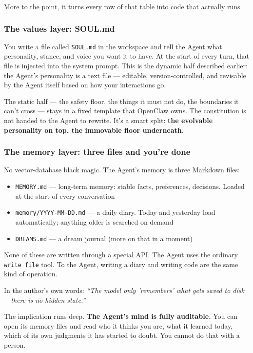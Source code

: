 \documentclass[11pt,a4paper]{article}
\begin{document}
More to the point, it turns every row of that table into code that actually runs.

\subsubsection{The values layer: SOUL.md}

You write a file called \texttt{SOUL.md} in the workspace and tell the Agent what personality, stance, and voice you want it to have. At the start of every turn, that file is injected into the system prompt. This is the dynamic half described earlier: the Agent's personality is a text file --- editable, version-controlled, and revisable by the Agent itself based on how your interactions go.

The static half --- the safety floor, the things it must not do, the boundaries it can't cross --- stays in a fixed template that OpenClaw owns. The constitution is not handed to the Agent to rewrite. It's a smart split: \textbf{the evolvable personality on top, the immovable floor underneath.}

\subsubsection{The memory layer: three files and you're done}

No vector-database black magic. The Agent's memory is three Markdown files:

\begin{itemize}
  \item \texttt{MEMORY.md} --- long-term memory: stable facts, preferences, decisions. Loaded at the start of every conversation
  \item \texttt{memory/YYYY-MM-DD.md} --- a daily diary. Today and yesterday load automatically; anything older is searched on demand
  \item \texttt{DREAMS.md} --- a dream journal (more on that in a moment)
\end{itemize}

None of these are written through a special API. The Agent uses the ordinary \texttt{write file} tool. To the Agent, writing a diary and writing code are the same kind of operation.

In the author's own words: \textit{``The model only 'remembers' what gets saved to disk---there is no hidden state.''}

The implication runs deep. \textbf{The Agent's mind is fully auditable.} You can open its memory files and read who it thinks you are, what it learned today, which of its own judgments it has started to doubt. You cannot do that with a person.
\end{document}

